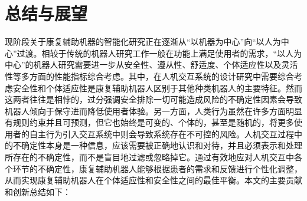 \chapter{总结与展望}
现阶段关于康复辅助机器的智能化研究正在逐渐从``以机器为中心''向``以人为中心''过渡。相较于传统的机器人研究工作一般在功能上满足使用者的需求，``以人为中心''的机器人研究需要进一步从安全性、遵从性、舒适度、个体适应性以及灵活性等多方面的性能指标综合考虑。其中，在人机交互系统的设计研究中需要综合考虑安全性和个体适应性是康复辅助机器人区别于其他种类机器人的主要特征。然而这两者往往是相悖的，过分强调安全排除一切可能造成风险的不确定性因素会导致机器人倾向于保守进而降低使用者体验。另一方面，人类行为虽然在许多方面明显有规则约束并且可预测，但它也始终是可变的、个体的，甚至是随机的，将更多使用者的自主行为引入交互系统中则会导致系统存在不可控的风险。人机交互过程中的不确定性本身是一种信息，应该需要被正确地认识和对待，并且必须表示和处理所存在的不确定性，而不是盲目地过滤或忽略掉它。通过有效地应对人机交互中各个环节的不确定性，康复辅助机器人能够根据患者的需求和反馈进行个性化调整，从而实现康复辅助机器人在个体适应性和安全性之间的最佳平衡。本文的主要贡献和创新总结如下：

